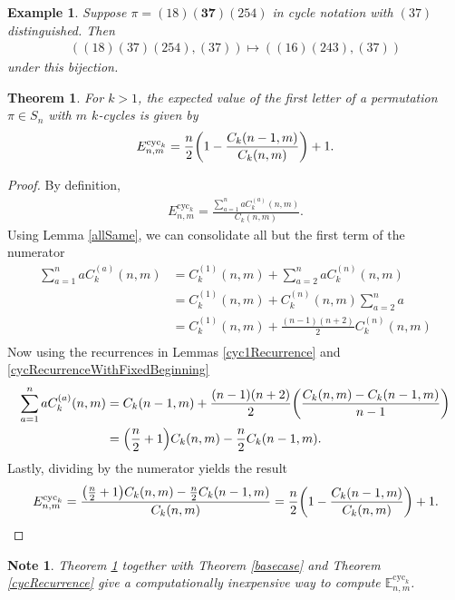 \documentclass{article}
\let\originalleft\left
\let\originalright\right
\renewcommand{\left}{\mathopen{}\mathclose\bgroup\originalleft}
\renewcommand{\right}{\aftergroup\egroup\originalright}
\numberwithin{equation}{subsection}
\newtheorem{theorem}[theo]{Theorem}
\newtheorem{example}[theo]{Example}
\newtheorem{note}[theo]{Note}
\newtheorem{todo}[theo]{To Do}
\begin{document}
\begin{example}
  Suppose $\pi = (18)\mathbf{(37)}(254)$ in cycle notation with $(37)$ distinguished.
  Then \begin{align}
    ((18)(37)(254), (37)) \mapsto ((16)(243), (37))
  \end{align} under this bijection.
\end{example}
\begin{theorem}
  \label{expectedValueCyck}
  For $k > 1$, the expected value of the first letter of a permutation
  $\pi \in S_n$ with $m$ $k$-cycles is given by \begin{align}
    E_{n,m}^{\text{cyc}_k} = \frac n2\left(1 - \frac{C_k(n-1,m)}{C_k(n,m)}\right) + 1.
  \end{align}
\end{theorem}
\begin{proof}
  By definition, \begin{align}
    E_{n,m}^{\text{cyc}_k} = \frac{
      \displaystyle \sum_{a = 1}^n aC_k^{(a)}(n, m)
    }{
      C_k(n, m)
    }.
  \end{align} Using Lemma \ref{allSame}, we can consolidate all but the first term of
  the numerator \begin{align}
    \sum_{a = 1}^n aC_k^{(a)}(n, m) &=
    C_k^{(1)}(n,m) + \sum_{a = 2}^n aC_k^{(n)}(n, m) \\
    &= C_k^{(1)}(n,m) + C_k^{(n)}(n, m)\sum_{a = 2}^n a \\
    &= C_k^{(1)}(n,m) + \frac{(n-1)(n+2)}{2} C_k^{(n)}(n, m) \\
  \end{align}
  Now using the recurrences in Lemmas \ref{cyc1Recurrence} and
  \ref{cycRecurrenceWithFixedBeginning} \begin{align}
    \sum_{a = 1}^n aC_k^{(a)}(n, m) &=
    C_k(n-1,m) + \frac{(n-1)(n+2)}{2}\left(
      \frac{C_k(n, m) - C_k(n-1, m)}{n - 1}
    \right) \\
    &= \left(\frac{n}{2} + 1\right) C_k(n,m) - \frac n2C_k(n-1,m).
  \end{align}
  Lastly, dividing by the numerator yields the result \begin{align}
    E_{n,m}^{\text{cyc}_k}
    = \frac{
      \left(\frac{n}{2} + 1\right) C_k(n,m) - \frac n2C_k(n-1,m)
    }{
      C_k(n, m)
    }
    = \frac n2\left(1 - \frac{C_k(n-1,m)}{C_k(n,m)}\right) + 1.
  \end{align}
\end{proof}
\begin{note}
  Theorem \ref{expectedValueCyck} together with Theorem \ref{basecase} and
  Theorem \ref{cycRecurrence} give a computationally inexpensive way to
  compute $\mathbb{E}_{n,m}^{\text{cyc}_k}$.
\end{note}
\end{document}
